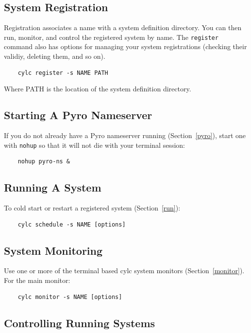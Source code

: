 \documentclass[11pt,a4paper]{article}
\begin{document}
\subsection{System Registration}

Registration associates a name with a system definition directory. You
can then run, monitor, and control the registered system by name. The
\lstinline=register= command also has options for managing your system
registrations (checking their validiy, deleting them, and so on).

\begin{lstlisting}
    cylc register -s NAME PATH
\end{lstlisting}

Where PATH is the location of the system definition directory. 

\subsection{Starting A Pyro Nameserver}

If you do not already have a Pyro nameserver running
(Section~\ref{pyro}), start one with \lstinline{nohup} so that it will
not die with your terminal session: 

\begin{lstlisting}
    nohup pyro-ns &
\end{lstlisting}


\subsection{Running A System} 

To cold start or restart a registered system (Section~\ref{run}):

\begin{lstlisting}
    cylc schedule -s NAME [options]
\end{lstlisting}
    
\subsection{System Monitoring}

Use one or more of the terminal based cylc system monitors
(Section~\ref{monitor}). For the main monitor: 

\begin{lstlisting}
    cylc monitor -s NAME [options]
\end{lstlisting}

\subsection{Controlling Running Systems}
\end{document}
